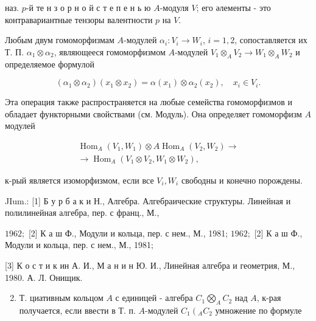 \documentclass[10pt]{article}
\begin{document}
наз. $p$-й те н з о р н о й с т е п е н ь ю $A$-модуля $V$; его әлементы - это контравариантные тензоры валентности $p$ на $V$.



Любым двум гомоморфизмам $A$-модулей $\alpha_{i}: V_{i} \rightarrow W_{i}$, $i=1,2$, сопоставляется их Т. П. $\alpha_{1} \otimes \alpha_{2}$, являющееся гомоморфизмом $A$-модулей $V_{1} \otimes_{A} V_{2} \rightarrow W_{1} \otimes_{A} W_{2}$ и определяемое формулой



\[

\left(\alpha_{1} \otimes \alpha_{2}\right)\left(x_{1} \otimes x_{2}\right)=\alpha\left(x_{1}\right) \otimes \alpha_{2}\left(x_{2}\right), \quad x_{i} \in V_{i} .

\]



Эта операция также распространяется на любые семейства гомоморфизмов и обладает функторными свойствами (см. Модуль). Она определяет гомоморфизм $A$ модулей



\[

\begin{gathered}

\operatorname{Hom}_{A}\left(V_{1}, W_{1}\right) \otimes A \operatorname{Hom}_{A}\left(V_{2}, W_{2}\right) \longrightarrow \\

\longrightarrow \operatorname{Hom}_{A}\left(V_{1} \otimes V_{2}, W_{1} \otimes W_{2}\right),

\end{gathered}

\]



к-рый является изоморфизмом, если все $V_{i}, W_{i}$ свободны и конечно порождены.



JIum.: [1] Б у р б а к и Н., Алгебра. Алгебраические структуры. Линейная и полилинейная алгебра, пер. с франц., М.,

$1962 ;$ [2] К а ш Ф., Модули и кольца, пер. с нем., М., 1981; $1962 ;$ [2] К а ш Ф., Модули и кольца, пер. с нем., М., 1981;

[3] К о с т и к ин А. И., М а н и н Ю. И., Линейная алгебра и геометрия, М., 1980. А. Л. Онищик.



\begin{enumerate}

  \setcounter{enumi}{1}

  \item Т. циативным кольцом $A$ с единицей - алгебра $C_{1} \bigotimes_{A} C_{2}$ над $A$, к-рая получается, если ввести в Т. п. $A$-модулей $C_{1}\left({ }_{A} C_{2}\right.$ умножение по формуле

\end{enumerate}
\end{document}
